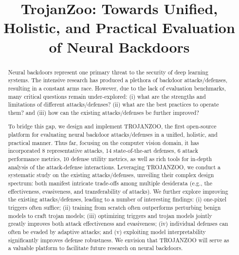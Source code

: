 \documentclass[compsoc,conference,a4paper,10pt,times]{IEEEtran}
\begin{document}
\title{TrojanZoo: Towards Unified, Holistic, and Practical Evaluation of Neural Backdoors}


\author{


}


\maketitle
\thispagestyle{plain}
\pagestyle{plain}

\begin{abstract}
Neural backdoors represent one primary threat to the security of deep learning systems. The intensive research has produced a plethora of backdoor attacks/defenses, resulting in a constant arms race. However, due to the lack of evaluation benchmarks, many critical questions remain under-explored: (i) what are the strengths and limitations of different attacks/defenses? (ii) what are the best practices to operate them? and (iii) how can the existing attacks/defenses be further improved?

To bridge this gap, we design and implement TROJANZOO, the first open-source platform for evaluating neural backdoor attacks/defenses in a unified, holistic, and practical manner. Thus far, focusing on the computer vision domain, it has incorporated 8 representative attacks, 14 state-of-the-art defenses, 6 attack performance metrics, 10 defense utility metrics, as well as rich tools for in-depth analysis of the attack-defense interactions. Leveraging TROJANZOO, we conduct a systematic study on the existing attacks/defenses, unveiling their complex design spectrum: both manifest intricate trade-offs among multiple desiderata (e.g., the effectiveness, evasiveness, and transferability of attacks). We further explore improving the existing attacks/defenses, leading to a number of interesting findings: (i) one-pixel triggers often suffice; (ii) training from scratch often outperforms perturbing benign models to craft trojan models; (iii) optimizing triggers and trojan models jointly greatly improves both attack effectiveness and evasiveness; (iv) individual defenses can often be evaded by adaptive attacks; and (v) exploiting model interpretability significantly improves defense robustness. 
We envision that TROJANZOO will serve as a valuable platform to facilitate future research on neural backdoors.

\end{abstract}
\end{document}

